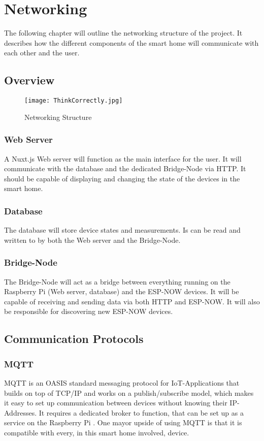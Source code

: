 \chapter{Networking}
The following chapter will outline the networking structure of 
the project. It describes how the different components of the
smart home will communicate with each other and the user.

\section{Overview}

\begin{figure}[H]
    \centering
    \texttt{[image: ThinkCorrectly.jpg]}
    \caption{Networking Structure}
\end{figure}
    \subsection{Web Server}
    A Nuxt.js Web server will function as the main interface
    for the user. It will communicate with the database and the
    dedicated Bridge-Node via HTTP. It should be capable of displaying
    and changing the state of the devices in the smart home.
    \subsection{Database}
    The database will store device states and measurements.
    Is can be read and written to by both the Web server and the
    Bridge-Node. 
    \subsection{Bridge-Node}
    The Bridge-Node will act as a bridge between everything running
    on the Raspberry Pi (Web server, database) and the ESP-NOW devices.
    It will be capable of receiving and sending data via both HTTP and
    ESP-NOW. It will also be responsible for discovering new ESP-NOW
    devices.

\section{Communication Protocols}
    \subsection{MQTT}
    MQTT is an OASIS standard messaging protocol for 
    IoT-Applications that builds on top of TCP/IP and 
    works on a publish/subscribe model, which makes it easy
    to set up communication between devices without knowing
    their IP-Addresses. It requires a dedicated broker to
    function, that can be set up as a service on the 
    Raspberry Pi \cite{mqtt_nodate}.
    One mayor upside of using MQTT is that it is compatible
    with every, in this smart home involved, device.


